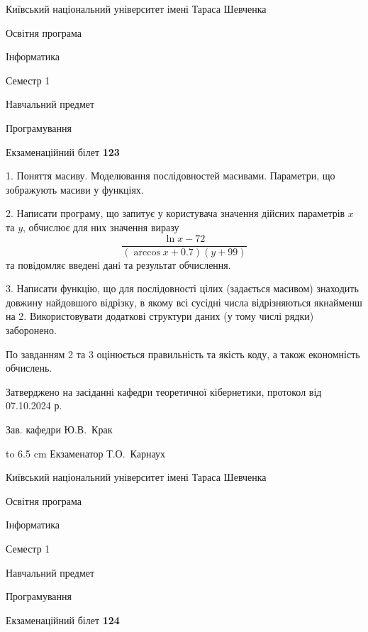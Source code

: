 \documentclass[12pt, ukrainian]{article}
\begin{document}
\vspace{0.9cm}
{{\begin {scriptsize}\par
{ \center  Київський національний університет імені Тараса Шевченка \par}
{\parbox {5 cm}{Освітня програма \hfill}{\parbox {7 cm}{Інформатика\hfill}}\parbox {6 cm}{\hfill Семестр 1}}\par
{\parbox {5 cm} {Навчальний предмет \hfill}\parbox {7 cm}{Програмування \hfill}\parbox {6cm}{\hfill}\par}\vspace{-15pt} \end{scriptsize}}{\center Екзаменаційний білет \No \textbf { 123 }\par}}
{%
1. Поняття масиву. Моделювання послідовностей масивами. Параметри, що зображують масиви у функціях.%
\par
2. Написати програму, що запитує у користувача значення дійсних параметрів $x$ та $y$, обчислює для них значення виразу 
$$\frac{\ln x - 72}{(\arccos x + 0.7) (y + 99)}$$ 
та повiдомляє введенi данi та результат обчислення.

\par
3. Написати функцію, що для послідовності цілих (задається масивом) знаходить довжину найдовшого відрізку, в якому всі сусідні числа відрізняються якнайменш на 2. Використовувати додаткові структури даних (у тому числі рядки) заборонено.

По завданням 2 та 3 оцінюється правильність та якість коду, а також економність обчислень.

}
{\smallskip\smallskip \begin {scriptsize} Затверджено на засіданні кафедри теоретичної кібернетики, протокол   від   07.10.2024 р.\par\smallskip\smallskip\smallskip\smallskip
{\parbox {6.5 cm} {Зав. кафедри \dotfill Ю.В.~Крак}}\hspace {0.7cm} {\hbox to 6.5 cm { Екзаменатор \dotfill Т.О.~Карнаух}} \end{scriptsize}}
\newpage
{{\begin {scriptsize}\par
{ \center  Київський національний університет імені Тараса Шевченка \par}
{\parbox {5 cm}{Освітня програма \hfill}{\parbox {7 cm}{Інформатика\hfill}}\parbox {6 cm}{\hfill Семестр 1}}\par
{\parbox {5 cm} {Навчальний предмет \hfill}\parbox {7 cm}{Програмування \hfill}\parbox {6cm}{\hfill}\par}\vspace{-15pt} \end{scriptsize}}{\center Екзаменаційний білет \No \textbf { 124 }\par}}
\end{document}

